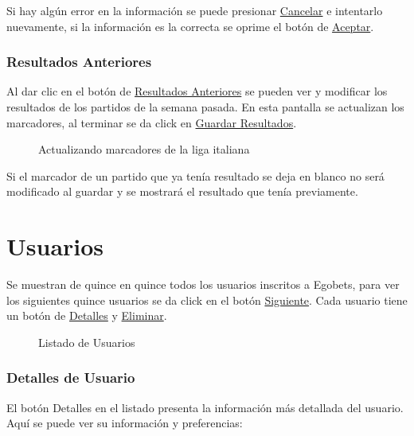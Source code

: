 Si hay algún error en la información se puede presionar \underline{Cancelar} e intentarlo nuevamente, si la información es la correcta se oprime el botón de \underline{Aceptar}.


\subsubsection{Resultados Anteriores}

Al dar clic en el botón de \underline{Resultados Anteriores} se pueden ver y modificar los resultados de los partidos de la semana pasada. En esta pantalla se actualizan los marcadores, al terminar se da click en \underline{Guardar Resultados}.

\begin{figure}[!htb]\centering
   \begin {minipage}{0.64\textwidth}
     \caption[Actualizar resultados Anteriores]{Actualizando marcadores de la liga italiana}
	 \label{Fig:Resultados-anteriores}
   \end{minipage}
\end{figure}

Si el marcador de un partido que ya tenía resultado se deja en blanco no será modificado al guardar y se mostrará el resultado que tenía previamente.

\section{Usuarios}

Se muestran de quince en quince todos los usuarios inscritos a Egobets, para ver los siguientes quince usuarios se da click en el botón \underline{Siguiente}. Cada usuario tiene un botón de \underline{Detalles} y \underline{Eliminar}.
\begin{figure}[!htb]\centering
   \begin {minipage}{1\textwidth}
     \caption{Listado de Usuarios}
	 \label{Fig:usuarios}
   \end{minipage}
\end{figure}

\subsubsection{Detalles de Usuario}

El botón Detalles en el listado presenta la información más detallada del usuario. Aquí se puede ver su información y preferencias:

